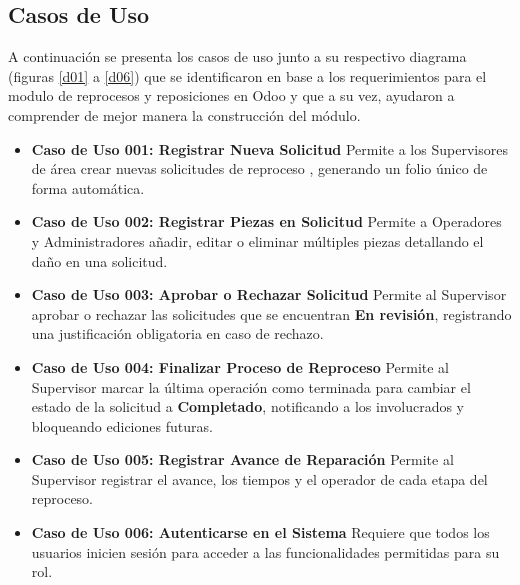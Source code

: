 \documentclass[12pt,letterpaper,spanish]{report}
\begin{document}
\subsection{Casos de Uso}
A continuación se presenta los casos de uso junto a su respectivo diagrama (figuras \ref{d01} a \ref{d06}) que se identificaron en base a los requerimientos para el modulo de reprocesos y 
reposiciones en Odoo y que a su vez, ayudaron a comprender de mejor manera la construcción del módulo. 
\begin{itemize}
    \item \textbf{Caso de Uso 001: Registrar Nueva Solicitud} 
    Permite a los Supervisores de área crear nuevas solicitudes de reproceso , generando un folio único de forma automática.

    \item \textbf{Caso de Uso 002: Registrar Piezas en Solicitud} 
    Permite a Operadores y Administradores añadir, editar o eliminar múltiples piezas  detallando el daño en una solicitud.

    \item \textbf{Caso de Uso 003: Aprobar o Rechazar Solicitud}
    Permite al Supervisor aprobar o rechazar las solicitudes que se encuentran \textbf{En revisión}, registrando una justificación obligatoria en caso de rechazo.

    \item \textbf{Caso de Uso 004: Finalizar Proceso de Reproceso}
    Permite al Supervisor marcar la última operación como terminada para cambiar el estado de la solicitud a \textbf{Completado}, notificando a los involucrados y bloqueando ediciones futuras.

    \item \textbf{Caso de Uso 005: Registrar Avance de Reparación} 
    Permite al Supervisor registrar el avance, los tiempos y el operador de cada etapa del reproceso.

    \item \textbf{Caso de Uso 006: Autenticarse en el Sistema} 
    Requiere que todos los usuarios inicien sesión para acceder a las funcionalidades permitidas para su rol.


\end{itemize}
\end{document}
